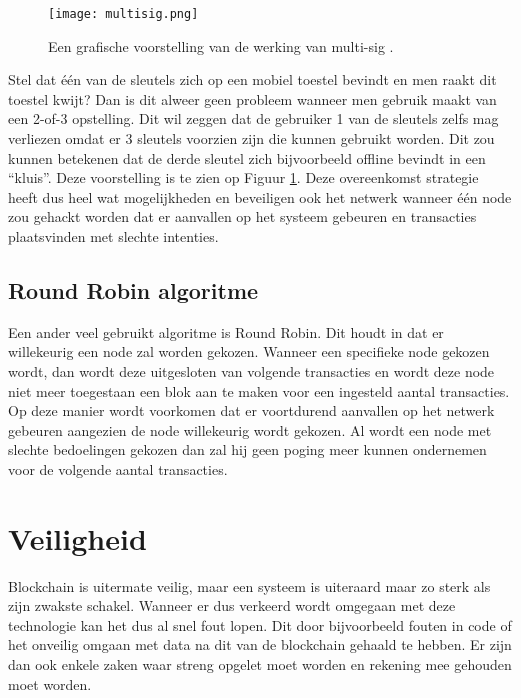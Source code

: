 \begin{figure}
	\texttt{[image: multisig.png]}
	\caption{Een grafische voorstelling van de werking van multi-sig \textcite{99bitcoins}.}
	\label{fig:multisig}
\end{figure}

Stel dat één van de sleutels zich op een mobiel toestel bevindt en men raakt dit toestel kwijt? 
Dan is dit alweer geen probleem wanneer men gebruik maakt van een 2-of-3 opstelling. Dit wil zeggen dat de gebruiker 1 van de sleutels zelfs mag verliezen omdat er 3 sleutels voorzien zijn die kunnen gebruikt worden. Dit zou kunnen betekenen dat de derde sleutel zich bijvoorbeeld offline bevindt in een ``kluis''. Deze voorstelling is te zien op Figuur \ref{fig:multisig}. Deze overeenkomst strategie heeft dus heel wat mogelijkheden en beveiligen ook het netwerk wanneer één node zou gehackt worden dat er aanvallen op het systeem gebeuren en transacties plaatsvinden met slechte intenties. 

\subsection{Round Robin algoritme}
Een ander veel gebruikt algoritme is Round Robin. Dit houdt in dat er willekeurig een node zal worden gekozen. Wanneer een specifieke node gekozen wordt, dan wordt deze uitgesloten van volgende transacties en wordt deze node niet meer toegestaan een blok aan te maken voor een ingesteld aantal transacties. Op deze manier wordt voorkomen dat er voortdurend aanvallen op het netwerk gebeuren aangezien de node willekeurig wordt gekozen. Al wordt een node met slechte bedoelingen gekozen dan zal hij geen poging meer kunnen ondernemen voor de volgende aantal transacties. 

\section{Veiligheid}
Blockchain is uitermate veilig, maar een systeem is uiteraard maar zo sterk als zijn zwakste schakel. Wanneer er dus verkeerd wordt omgegaan met deze technologie kan het dus al snel fout lopen. Dit door bijvoorbeeld fouten in code of het onveilig omgaan met data na dit van de blockchain gehaald te hebben. Er zijn dan ook enkele zaken waar streng opgelet moet worden en rekening mee gehouden moet worden. 

